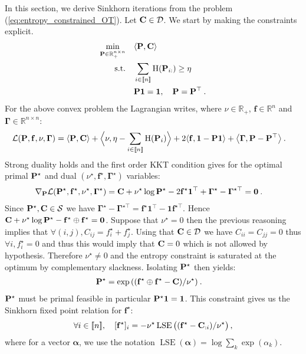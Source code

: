 In this section, we derive Sinkhorn iterations from the problem (\ref{eq:entropy_constrained_OT}). Let ${\mathbf{C}} \in \mathcal{D}$. We start by making the constraints explicit.
\begin{align}
    \min_{{\mathbf{P}} \in \mathbb{R}_+^{n \times n}} \quad &\langle {\mathbf{P}}, {\mathbf{C}} \rangle \\
    \text{s.t.} \quad &\sum_{i \in {[\![n]\!]}} \operatorname{H}({\mathbf{P}}_{i:}) \geq \eta \\
    & {\mathbf{P}} \bm{1} = \bm{1}, \quad {\mathbf{P}} = {\mathbf{P}}^\top \:.
\end{align}
For the above convex problem the Lagrangian writes, where $\nu \in \mathbb{R}_+$, $\mathbf{f} \in \mathbb{R}^n$ and $\bm{\Gamma} \in \mathbb{R}^{n \times n}$:
\begin{align}
    \mathcal{L}({\mathbf{P}}, \mathbf{f}, \nu, \bm{\Gamma}) &= \langle {\mathbf{P}}, {\mathbf{C}} \rangle + \Big\langle \nu, \eta - \sum_{i \in {[\![n]\!]}} \operatorname{H}({\mathbf{P}}_i) \Big\rangle + 2\langle \mathbf{f}, \bm{1} - {\mathbf{P}} \bm{1} \rangle + \big\langle \bm{\Gamma}, {\mathbf{P}} - {\mathbf{P}}^\top \big\rangle \:.
\end{align}
Strong duality holds and the first order KKT condition gives for the optimal primal ${\mathbf{P}}^\star$ and dual $(\nu^\star, \mathbf{f}^\star, \bm{\Gamma}^\star)$ variables: 
\begin{align}
    \nabla_{{\mathbf{P}}} \mathcal{L}({\mathbf{P}}^\star, \mathbf{f}^\star, \nu^\star, \bm{\Gamma}^\star) &= {\mathbf{C}} + \nu^\star \log{{\mathbf{P}}^\star} - 2\mathbf{f}^\star \bm{1}^\top + \bm{\Gamma}^\star - \bm{\Gamma}^{\star\top} = \bm{0} \:.
\end{align}
Since ${\mathbf{P}}^\star, {\mathbf{C}} \in \mathcal{S}$ we have $\bm{\Gamma}^\star - \bm{\Gamma}^{\star\top} = \mathbf{f}^\star \bm{1}^\top - \bm{1}\mathbf{f}^{\star \top}$. Hence ${\mathbf{C}} + \nu^\star \log{{\mathbf{P}}^\star} - \mathbf{f}^\star \oplus \mathbf{f}^\star = \bm{0}$. Suppose that $\nu^\star = 0$ then the previous reasoning implies that $\forall (i,j), C_{ij} = f_i^\star + f_j^\star$. Using that ${\mathbf{C}} \in \mathcal{D}$ we have $C_{ii} = C_{jj} = 0$ thus $\forall i,  f^\star_i = 0$ and thus this would imply that ${\mathbf{C}} = 0$ which is not allowed by hypothesis. Therefore $\nu^\star \neq 0$ and the entropy constraint is saturated at the optimum by complementary slackness. Isolating ${\mathbf{P}}^\star$ then yields:
\begin{align}
    {\mathbf{P}}^{\star} &= \exp{\left( (\mathbf{f}^\star \oplus \mathbf{f}^{\star} - {\mathbf{C}}) / \nu^\star \right)} \:.
\end{align}
${\mathbf{P}}^\star$ must be primal feasible in particular ${\mathbf{P}}^\star \bm{1} = \bm{1}$. This constraint gives us the Sinkhorn fixed point relation for $\mathbf{f}^\star$:
\begin{align}
    \forall i \in {[\![n]\!]}, \quad [\mathbf{f}^\star]_i = - \nu^\star \operatorname{LSE} \big((\mathbf{f}^\star - {\mathbf{C}}_{:i}) / \nu^\star \big)\,,
\end{align}
where for a vector $\bm{\alpha}$, we use the notation
$\operatorname{LSE}(\bm{\alpha}) = \log \sum_{k} \exp (\alpha_k)$.



